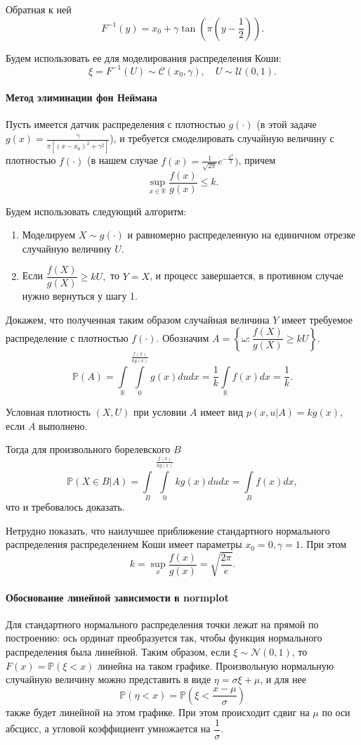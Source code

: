 \documentclass[16pt]{article}
\newcommand\Real{\mathbb{R}}
\newcommand\A{(\cdot)}
\newcommand\Int[2]{\int\limits_{#1}^{#2}}
\newcommand{\Prb}{\mathbb{P}}
\begin{document}
Обратная к ней
$$F^{-1}(y) = x_0 + \gamma \tan\left(\pi\left(y - \frac12\right)\right).$$

Будем использовать ее для моделирования распределения Коши:
$$\xi = F^{-1}(U) \sim \mathcal{C}(x_0, \gamma), \quad U \sim \mathcal{U}(0, 1).$$

\paragraph{Метод элиминации фон Неймана}
Пусть имеется датчик распределения с плотностью $g(\cdot)$ (в этой задаче 
$g(x) = \frac{\gamma}{\pi[(x - x_0)^2 + \gamma^2]}$), и требуется смоделировать случайную величину с плотностью $f(\cdot)$ (в нашем случае $f(x) = \frac{1}{\sqrt{2\pi}}e^{-\frac{x^2}{2}})$, причем
$$\sup_{x \in \Real} \frac{f(x)}{g(x)} \leq k.$$

Будем использовать следующий алгоритм:
\begin{enumerate}
	\item Моделируем $X \sim g\A$ и равномерно распределенную на единичном отрезке случайную  величину $U$.
	\item Если $\dfrac{f(X)}{g(X)} \geq kU,$
то $Y = X$, и процесс завершается, в противном случае нужно вернуться у шагу 1.
\end{enumerate} 

Докажем, что полученная таким образом случайная величина $Y$ имеет требуемое распределение с плотностью $f\A$.
Обозначим $A = \left\{\omega\colon \dfrac{f(X)}{g(X)} \geq kU\right\}$.
$$\Prb(A) = \int\limits_\Real\Int{0}{\frac{f(x)}{kg(x)}}g(x)dudx = \dfrac{1}{k}\int\limits_\Real f(x)dx = \dfrac{1}{k}.$$

Условная плотность $(X, U)$ при условии $A$ имеет вид
$p(x, u | A) = kg(x)$, если $A$ выполнено.

Тогда для произвольного борелевского $B$
$$\Prb(X \in B | A) = \int\limits_B\Int{0}{\frac{f(x)}{kg(x)}}kg(x)dudx = \int\limits_B f(x) dx,$$
что и требовалось доказать.

Нетрудно показать, что наилучшее приближение стандартного нормального распределения распределением Коши имеет параметры $x_0 = 0, \gamma = 1$. При этом
$$k = \sup_x \frac{f(x)}{g(x)} = \sqrt{\dfrac{2\pi}{e}}.$$

\paragraph{Обоснование линейной зависимости в normplot}
Для стандартного нормального распределения точки лежат на прямой по построению: ось ординат преобразуется так, чтобы функция нормального распределения была линейной. Таким образом, если $\xi \sim \mathcal{N}(0, 1)$, то $F(x) = \mathbb{P}(\xi < x)$ линейна на таком графике. Произвольную нормальную случайную величину можно представить в виде $\eta = \sigma \xi + \mu$, и для нее
$$\mathbb{P}(\eta < x) = \mathbb{P}\left(\xi < \frac{x - \mu}{\sigma}\right)$$
также будет линейной на этом графике. При этом происходит сдвиг на $\mu$ по оси абсцисс, а угловой коэффициент умножается на $\dfrac{1}{\sigma}$.
\end{document}
